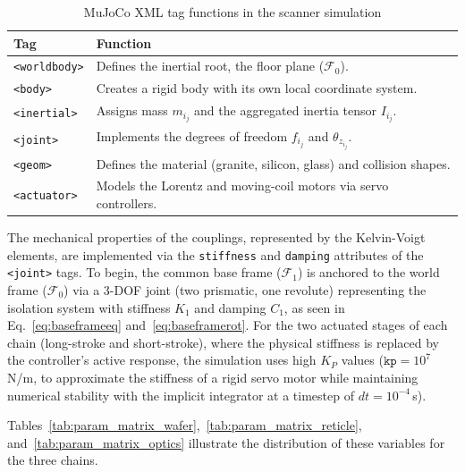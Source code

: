 \begin{table}[htbp]
\centering
\caption{MuJoCo XML tag functions in the scanner simulation}
\label{tab:mujoco_tags}
\begin{tabular}{ll}
\toprule
Tag & Function \\
\midrule
\texttt{<worldbody>} & Defines the inertial root, the floor plane ($\mathcal{F}_0$). \\
\texttt{<body>}      & Creates a rigid body with its own local coordinate system. \\
\texttt{<inertial>}  & Assigns mass $m_{i_j}$ and the aggregated inertia tensor $I_{i_j}$. \\
\texttt{<joint>}     & Implements the degrees of freedom $f_{i_j}$ and $\theta_{z_{i_j}}$. \\
\texttt{<geom>}      & Defines the material (granite, silicon, glass) and collision shapes. \\
\texttt{<actuator>}  & Models the Lorentz and moving-coil motors via servo controllers. \\
\bottomrule
\end{tabular}
\end{table}

The mechanical properties of the couplings, represented by the Kelvin-Voigt elements, are implemented via the \texttt{stiffness} and \texttt{damping} attributes of the \texttt{<joint>} tags. To begin, the common base frame ($\mathcal{F}_1$) is anchored to the world frame ($\mathcal{F}_0$) via a 3-DOF joint (two prismatic, one revolute) representing the isolation system with stiffness $K_1$ and damping $C_1$, as seen in Eq.~\eqref{eq:baseframeeq} and~\eqref{eq:baseframerot}. For the two actuated stages of each chain (long-stroke and short-stroke), where the physical stiffness is replaced by the controller's active response, the simulation uses high $K_P$ values ($\texttt{kp} = 10^7$\,N/m, to approximate the stiffness of a rigid servo motor while maintaining numerical stability with the implicit integrator at a timestep of $dt = 10^{-4}$\,s).

Tables~\ref{tab:param_matrix_wafer},~\ref{tab:param_matrix_reticle}, and~\ref{tab:param_matrix_optics} illustrate the distribution of these variables for the three chains.

